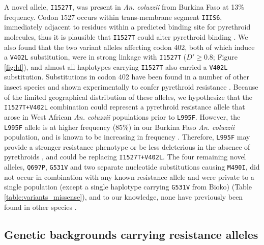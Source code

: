 \documentclass[a4paper,11pt,abstracton,hidelinks]{scrartcl}
\begin{document}
%
A novel allele, \texttt{I1527T}, was present in \textit{An. coluzzii} from Burkina Faso at 13\% frequency.
%
Codon 1527 occurs within trans-membrane segment \texttt{IIIS6}, immediately adjacent to residues within a predicted binding site for pyrethroid molecules, thus it is plausible that \texttt{I1527T} could alter pyrethroid binding \cite{Du2013,Dong2014}.
%
We also found that the two variant alleles affecting codon 402, both of which induce a \texttt{V402L} substitution, were in strong linkage with \texttt{I1527T} ($D' \geq 0.8$; Figure \ref{fig:ld}), and almost all haplotypes carrying \texttt{I1527T} also carried a \texttt{V402L} substitution.
%
Substitutions in codon 402 have been found in a number of other insect species and shown experimentally to confer pyrethroid resistance \cite{Dong2014}.
%
Because of the limited geographical distribution of these alleles, we hypothesize that the \texttt{I1527T+V402L} combination could represent a pyrethroid resistance allele that arose in West African \textit{An. coluzzii} populations prior to \texttt{L995F}.
%
However, the \texttt{L995F} allele is at higher frequency (85\%) in our Burkina Faso \textit{An. coluzzii} population, and is known to be increasing in frequency \cite{Toe2014}.
%
Therefore, \texttt{L995F} may provide a stronger resistance phenotype or be less deleterious in the absence of pyrethroids \cite{brito2013}, and could be replacing \texttt{I1527T+V402L}.
%
The four remaining novel alleles, \texttt{Q697P}, \texttt{G531V} and two separate nucleotide substitutions causing \texttt{M490I}, did not occur in combination with any known resistance allele and were private to a single population (except a single haplotype carrying \texttt{G531V} from Bioko) (Table \ref{table:variants_missense}), and to
 our knowledge, none have previously been found in other species \cite{Rinkevich2013, Dong2014}.


\subsection*{Genetic backgrounds carrying resistance alleles}
\end{document}
